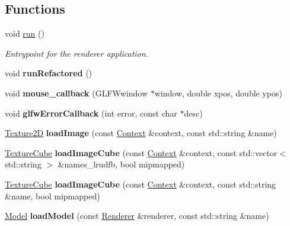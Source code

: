 \subsection*{Functions}
\begin{DoxyCompactItemize}
\item 
void \hyperlink{namespaceblaze_a30b4c7084364b8340000c327f37f794b}{run} ()
\begin{DoxyCompactList}\small\item\em Entrypoint for the renderer application. \end{DoxyCompactList}\item 
\mbox{\label{namespaceblaze_a2ddba469a0ed0509a118c5420eec1d9f}} 
void {\bfseries run\+Refactored} ()
\item 
\mbox{\label{namespaceblaze_aa10526b51f9cf2e534be62ee0fb968b5}} 
void {\bfseries mouse\+\_\+callback} (G\+L\+F\+Wwindow $\ast$window, double xpos, double ypos)
\item 
\mbox{\label{namespaceblaze_aabb1a7d32442a2cb7d6a80f1af0950c4}} 
void {\bfseries glfw\+Error\+Callback} (int error, const char $\ast$desc)
\item 
\mbox{\label{namespaceblaze_a4a6285676d7d48a4e06cbd07d8b6d3be}} 
\hyperlink{classblaze_1_1Texture2D}{Texture2D} {\bfseries load\+Image} (const \hyperlink{classblaze_1_1Context}{Context} \&context, const std\+::string \&name)
\item 
\mbox{\label{namespaceblaze_af8bf04e378ca597c68e2585421671200}} 
\hyperlink{classblaze_1_1TextureCube}{Texture\+Cube} {\bfseries load\+Image\+Cube} (const \hyperlink{classblaze_1_1Context}{Context} \&context, const std\+::vector$<$ std\+::string $>$ \&names\+\_\+lrudfb, bool mipmapped)
\item 
\mbox{\label{namespaceblaze_a11c179e5afef9f26e7395f7d8016692f}} 
\hyperlink{classblaze_1_1TextureCube}{Texture\+Cube} {\bfseries load\+Image\+Cube} (const \hyperlink{classblaze_1_1Context}{Context} \&context, const std\+::string \&name, bool mipmapped)
\item 
\mbox{\label{namespaceblaze_a692ba015ac23cd0fc2840cdf1eea539d}} 
\hyperlink{classblaze_1_1Model}{Model} {\bfseries load\+Model} (const \hyperlink{classblaze_1_1Renderer}{Renderer} \&renderer, const std\+::string \&name)

\end{DoxyCompactItemize}
